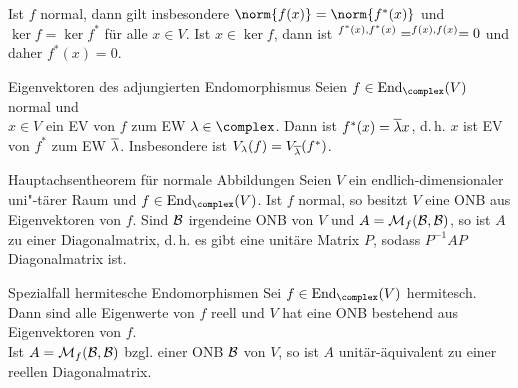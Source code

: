 \begin{Kor}
    Ist $f$ normal, dann gilt insbesondere $\norm{f(x)} = \norm{f^\ast(x)}$
    und $\ker f = \ker f^\ast$ für alle $x \in V$.
    Ist $x \in \ker f$, dann ist $\sp{f^\ast(x), f^\ast(x)} =
    \sp{f(x), f(x)} = 0$ und daher $f^\ast(x) = 0$.
\end{Kor}

\begin{Satz}{Eigenvektoren des adjungierten Endomorphismus}
    Seien $f \in \End_\complex(V)$ normal und \\
    $x \in V$ ein EV von $f$ zum EW $\lambda \in \complex$.
    Dann ist $f^\ast(x) = \overline{\lambda}x$, d.\,h. $x$ ist EV von $f^\ast$ zum
    EW $\overline{\lambda}$.
    Insbesondere ist $V_\lambda(f) = V_{\overline{\lambda}}(f^\ast)$.
\end{Satz}

\begin{Satz}{Hauptachsentheorem für normale Abbildungen}
    Seien $V$ ein endlich-dimensionaler uni"-tärer Raum und
    $f \in \End_\complex(V)$.
    Ist $f$ normal, so besitzt $V$ eine ONB aus Eigenvektoren von $f$.
    Sind $\mathcal{B}$ irgendeine ONB von $V$ und $A = \mathcal{M}_{f}(\mathcal{B},\mathcal{B})$, so
    ist $A$  zu einer Diagonalmatrix,
    d.\,h. es gibt eine
    unitäre Matrix $P$, sodass $P^{-1} A P$ Diagonalmatrix ist.
\end{Satz}

\begin{Satz}{Spezialfall hermitesche Endomorphismen}
    Sei $f \in \End_\complex(V)$ hermitesch.
    Dann sind alle Eigenwerte von $f$ reell und $V$ hat eine ONB bestehend
    aus Eigenvektoren von $f$. \\
    Ist $A = \mathcal{M}_{f}(\mathcal{B},\mathcal{B})$ bzgl. einer ONB $\mathcal{B}$ von $V$, so ist
    $A$ unitär-äquivalent zu einer reellen Diagonalmatrix.
\end{Satz}

\pagebreak
